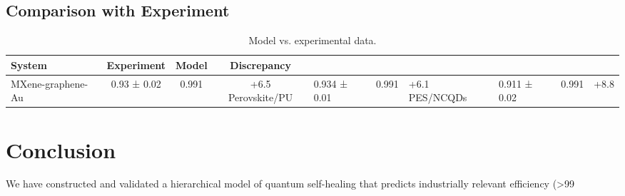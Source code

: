 \documentclass[12pt]{article}
\begin{document}
\subsection{Comparison with Experiment}
\begin{table}[h]
\centering
\caption{Model vs. experimental data.}
\begin{tabular}{lccc}
\hline
System & Experiment & Model & Discrepancy \\
\hline
MXene-graphene-Au & 0.93 ± 0.02 & 0.991 & +6.5%
Perovskite/PU & 0.934 ± 0.01 & 0.991 & +6.1%
PES/NCQDs & 0.911 ± 0.02 & 0.991 & +8.8%
\hline
\end{tabular}
\end{table}

\section{Conclusion}
We have constructed and validated a hierarchical model of quantum self-healing that predicts industrially relevant efficiency (>99%
\end{document}
